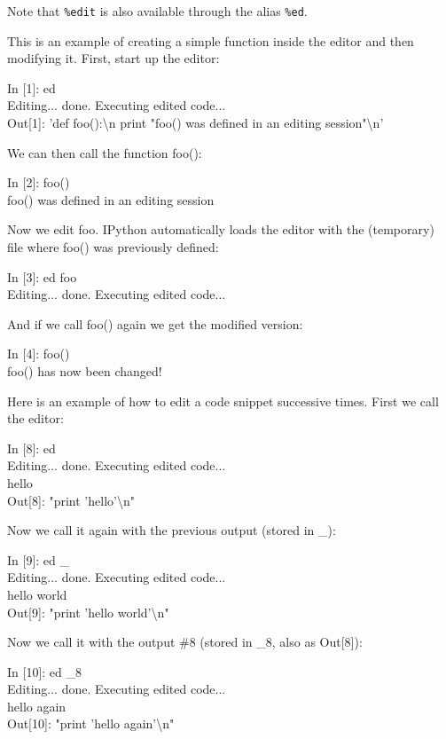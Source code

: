         Note that \texttt{\%edit} is also available through the alias \texttt{\%ed}.

        This is an example of creating a simple function inside the editor and
        then modifying it. First, start up the editor:

        In [1]: ed\\
        Editing... done. Executing edited code...\\
        Out[1]: 'def foo():\textbackslash{}n    print "foo() was defined in an editing session"\textbackslash{}n'

        We can then call the function foo():
        
        In [2]: foo()\\
        foo() was defined in an editing session

        Now we edit foo.  IPython automatically loads the editor with the
        (temporary) file where foo() was previously defined:
        
        In [3]: ed foo\\
        Editing... done. Executing edited code...

        And if we call foo() again we get the modified version:
        
        In [4]: foo()\\
        foo() has now been changed!

        Here is an example of how to edit a code snippet successive
        times. First we call the editor:

        In [8]: ed\\
        Editing... done. Executing edited code...\\
        hello\\
        Out[8]: "print 'hello'\textbackslash{}n"

        Now we call it again with the previous output (stored in \_):

        In [9]: ed \_\\
        Editing... done. Executing edited code...\\
        hello world\\
        Out[9]: "print 'hello world'\textbackslash{}n"

        Now we call it with the output \#8 (stored in \_8, also as Out[8]):

        In [10]: ed \_8\\
        Editing... done. Executing edited code...\\
        hello again\\
        Out[10]: "print 'hello again'\textbackslash{}n"


